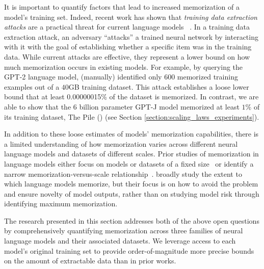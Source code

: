 It is important to  quantify factors that lead to increased memorization of a model's training set.
%
Indeed, recent work has shown that \emph{training data extraction attacks} are a practical threat for current language models ~\citep{carlini2020extracting}.
In a training data extraction attack, an adversary ``attacks'' a trained neural network by interacting with it with the goal of establishing whether a specific item was in the training data.
While current attacks are effective, they represent a lower bound on how much memorization occurs in existing models.
%
For example, by querying
the GPT-2 language model, \citet{carlini2020extracting} (manually) identified only $600$ memorized training examples out of a $40$GB training dataset.
%
This attack establishes a loose lower bound that at least
0.00000015\%
of the dataset is memorized. %
% 
In contrast, we are able to show that the 6 billion parameter 
GPT-J model \citep{gpt-neo,gpt-j} memorized at least $1\%$ of its training dataset, The Pile (\cite{gao2020pile}) (see Section \ref{section:scaling_laws_experiments}).

In addition to these loose estimates of models' memorization capabilities, there is a limited understanding of how memorization varies across different neural language models and datasets of different scales.
%
Prior studies of memorization in language models either focus on models or datasets of a fixed size~\citep{carlini2019secret, zhang2021counterfactual, thakkar2020understanding} or identify a narrow memorization-versus-scale relationship~\citep{carlini2020extracting, lee2021deduplicating}.
\citet{mccoy2021raven} broadly study the extent to which language models memorize, but their focus is on how to avoid the problem and ensure novelty of model outputs, rather than on studying model risk through identifying maximum memorization.

The research presented in this section addresses both of the above open questions by 
comprehensively quantifying memorization across three families of neural language models and their associated datasets.
%
We leverage access to each model's original training set to provide order-of-magnitude more precise bounds on the amount of extractable data than in prior works.

